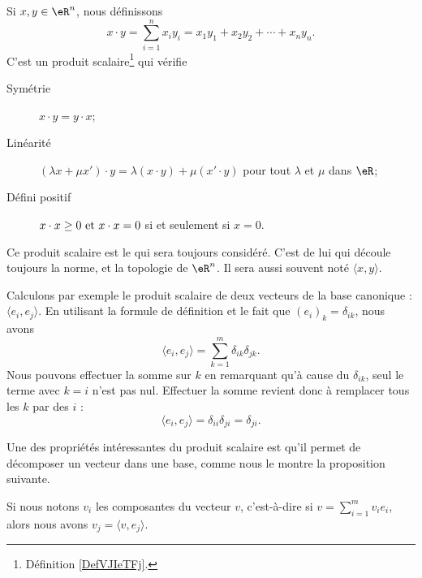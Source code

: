 \begin{propositionDef}     \label{PROPooSKVRooDGVCYj}
    Si \( x,y\in \eR^n\), nous définissons
    \begin{equation}        \label{EQooFITHooEXDCGd}
        x\cdot y=\sum_{i=1}^n x_iy_i =x_1y_1+x_2y_2+\cdots+x_ny_n.
    \end{equation}
    C'est un produit scalaire\footnote{Définition \ref{DefVJIeTFj}.} qui vérifie
    \begin{description}
        \item[Symétrie] \( x\cdot y=y\cdot x\);
        \item[Linéarité] \( (\lambda x+\mu x')\cdot y=\lambda(x\cdot y)+\mu(x'\cdot y)\) pour tout \( \lambda\) et \( \mu\) dans \( \eR\);
        \item[Défini positif] \( x\cdot x\geq 0$ et $x\cdot x=0\) si et seulement si \( x=0\).
    \end{description}
    Ce produit scalaire est le  qui sera toujours considéré. C'est de lui qui découle toujours la norme, et la topologie de \( \eR^n\). Il sera aussi souvent noté \( \langle x, y\rangle \).
\end{propositionDef}


Calculons par exemple le produit scalaire de deux vecteurs de la base canonique : \( \langle e_i, e_j\rangle\). En utilisant la formule de définition et le fait que \( (e_i)_k=\delta_{ik}\), nous avons
\begin{equation}
    \langle e_i, e_j\rangle =\sum_{k=1}^m\delta_{ik}\delta_{jk}.
\end{equation}
Nous pouvons effectuer la somme sur $k$ en remarquant qu'à cause du \( \delta_{ik}\), seul le terme avec \( k=i\) n'est pas nul. Effectuer la somme revient donc à remplacer tous les \( k\) par des \( i\) :
\begin{equation}
    \langle e_i, e_j\rangle =\delta_{ii}\delta_{ji}=\delta_{ji}.
\end{equation}

Une des propriétés intéressantes du produit scalaire est qu'il permet de décomposer un vecteur dans une base, comme nous le montre la proposition suivante.

\begin{proposition}     \label{PropScalCompDec}
    Si nous notons \( v_i\) les composantes du vecteur \( v\), c'est-à-dire si \( v=\sum_{i=1}^m v_ie_i\), alors nous avons \( v_j=\langle v, e_j\rangle\).
\end{proposition}

